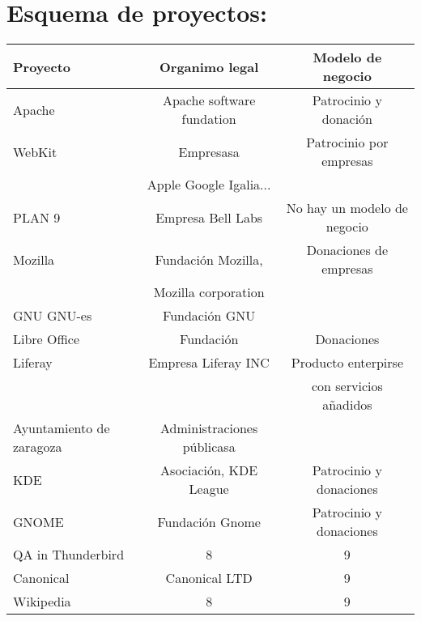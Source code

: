 \documentclass[12pt]{article} %
\begin{document}
\section{Esquema de proyectos:}
\begin{tabular}{| l | c | c | }
     \hline
     Proyecto & Organimo legal & Modelo de negocio \\ \hline
     Apache & Apache software fundation & Patrocinio y donación \\ \hline
     WebKit & Empresasa &Patrocinio por empresas \\
     &Apple Google Igalia... & \\ \hline
     PLAN 9 & Empresa Bell Labs & No hay un modelo de negocio \\ \hline
     Mozilla & Fundación Mozilla, & Donaciones de empresas \\
     & Mozilla corporation & \\ \hline
     GNU GNU-es & Fundación GNU &  \\ \hline
     Libre Office & Fundación & Donaciones \\ \hline
     Liferay & Empresa Liferay INC & Producto enterpirse\\&& con servicios añadidos \\ \hline
     Ayuntamiento de zaragoza & Administraciones públicasa &  \\ \hline
     KDE & Asociación, KDE League & Patrocinio y donaciones \\ \hline
     GNOME & Fundación Gnome & Patrocinio y donaciones \\ \hline
     QA in Thunderbird & 8 & 9 \\ \hline
     Canonical & Canonical LTD & 9 \\ \hline
     Wikipedia & 8 & 9 \\ \hline
    
   \end{tabular}
   
\end{document}
